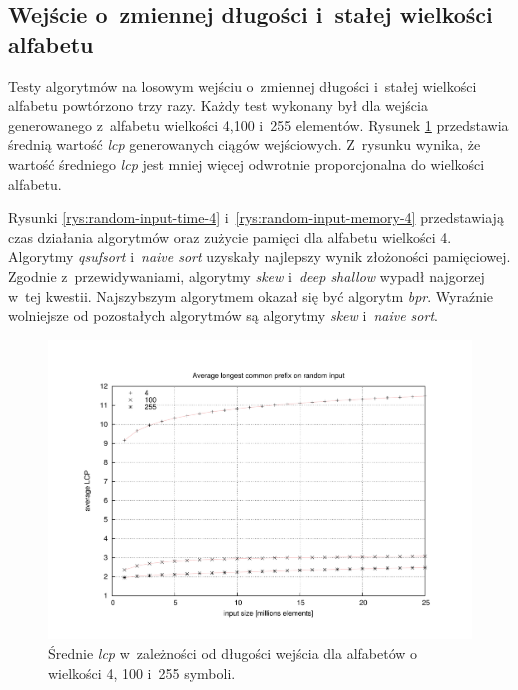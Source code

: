	
\subsection{Wejście o~zmiennej długości i~stałej wielkości alfabetu}

Testy algorytmów na losowym wejściu o~zmiennej długości i~stałej wielkości alfabetu powtórzono trzy
razy. Każdy test wykonany był dla wejścia generowanego z~alfabetu wielkości 4,100 i~255 elementów.
Rysunek \ref{rys:random-input-lcp} przedstawia średnią wartość \emph{lcp} generowanych ciągów
wejściowych. Z~rysunku wynika, że wartość średniego \emph{lcp} jest mniej więcej odwrotnie
proporcjonalna do wielkości alfabetu.
		
Rysunki \ref{rys:random-input-time-4} i~\ref{rys:random-input-memory-4} przedstawiają czas działania
algorytmów oraz zużycie pamięci dla alfabetu wielkości 4. Algorytmy \emph{qsufsort} i~\emph{naive
sort} uzyskały najlepszy wynik złożoności pamięciowej. Zgodnie z~przewidywaniami, algorytmy
\emph{skew} i~\emph{deep shallow} wypadł najgorzej w~tej kwestii. Najszybszym algorytmem okazał się
być algorytm \emph{bpr}. Wyraźnie wolniejsze od pozostałych algorytmów są algorytmy \emph{skew}
i~\emph{naive sort}.


\begin{figure}[t]
       \begin{center}
            \includegraphics[width=\linewidth]{figures/results/random-input-lcp}
        \end{center}
    \caption{Średnie \emph{lcp} w~zależności od długości wejścia dla alfabetów o wielkości 4, 100 i~255 symboli.}%
    \label{rys:random-input-lcp}
\end{figure}

